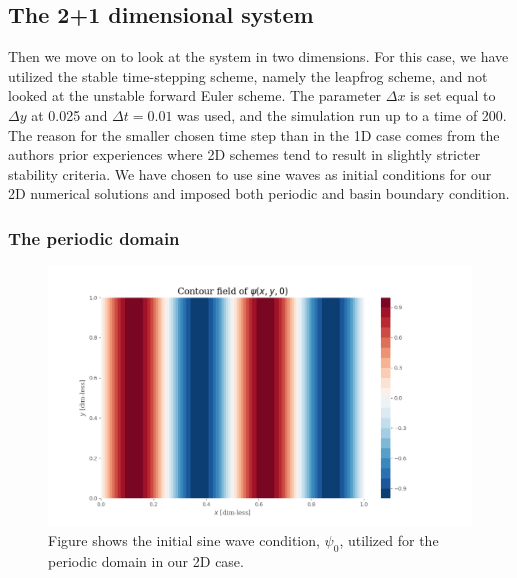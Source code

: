 \documentclass[12pt]{article}
\numberwithin{figure}{section}
\numberwithin{table}{section}
\begin{document}
\subsection{The 2+1 dimensional system} \label{sec:results_2d}
Then we move on to look at the system in two dimensions. For this case, we have utilized the stable time-stepping scheme, namely the leapfrog scheme, and not looked at the unstable forward Euler scheme. The parameter $\Delta x$ is set equal to $\Delta y$ at 0.025 and $\Delta t=0.01$ was used, and the simulation run up to a time of 200. The reason for the smaller chosen time step than in the 1D case comes from the authors prior experiences where 2D schemes tend to result in slightly stricter stability criteria. We have chosen to use sine waves as initial conditions for our 2D numerical solutions and imposed both periodic and basin boundary condition. \\



\subsubsection{The periodic domain}
\begin{figure}[ht]
 \centerline{\includegraphics[scale = 0.50]{psi0_2d_periodic.png}}
 \caption{Figure shows the initial sine wave condition, $\psi_0$, utilized for the periodic domain in our 2D case.}
 \label{fig:2d_periodic}
\end{figure}
\end{document}
